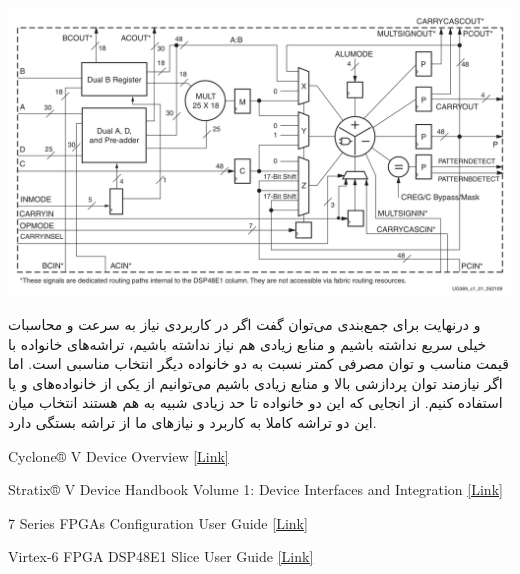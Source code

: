 \begin{qsolve}
	\begin{center}
		\includegraphics*[width=1\linewidth]{pics/img13.png}
		\label{درون بلوک DSP48}
	\end{center}
	
	و درنهایت برای جمع‌بندی می‌توان گفت اگر در کاربردی نیاز به سرعت و محاسبات خیلی سریع نداشته باشیم و منابع زیادی هم نیاز نداشته باشیم، تراشه‌های خانواده  با قیمت مناسب و توان مصرفی کمتر نسبت به دو خانواده دیگر انتخاب مناسبی است. اما اگر نیازمند توان پردازشی بالا و منابع زیادی باشیم می‌توانیم از یکی از خانواده‌های \lr[Stratix] و یا  استفاده کنیم. از انجایی که این دو خانواده تا حد زیادی شبیه به هم هستند انتخاب میان این دو تراشه کاملا به کاربرد و نیاز‌های ما از تراشه بستگی دارد.
\end{qsolve}
 


\begin{latin}
	\begin{thebibliography}{9}
		Cyclone® V Device Overview \href{https://www.intel.com/content/www/us/en/docs/programmable/683694/current/cyclone-v-device-overview.html}{[Link]}
		
		Stratix® V Device Handbook
		Volume 1: Device Interfaces and Integration \href{https://www.intel.com/content/www/us/en/docs/programmable/683694/current/cyclone-v-device-overview.html}{[Link]}
		
		7 Series FPGAs
		Configuration
		User Guide \href{https://docs.amd.com/v/u/en-US/ug470_7Series_Config}{[Link]}
		
		Virtex-6 FPGA
		DSP48E1 Slice
		User Guide \href{https://docs.amd.com/v/u/en-US/ug369}{[Link]}
	\end{thebibliography} 
\end{latin}